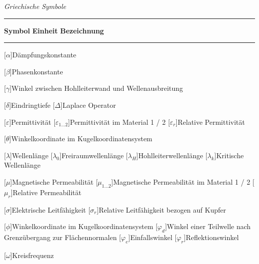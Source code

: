 \newpage



\textit{Griechische Symbole} \\[.5\linespace]
\noindent\rule{\textwidth}{0.5pt}
\textbf{Symbol} \hspace{12.5mm} \textbf{Einheit} \hspace{10.5mm} \textbf{Bezeichnung} \\[-\linespace]
\noindent\rule{\textwidth}{0.5pt}

\begin{acronym}[Platzhalterwort]
[$\alpha$]{\acrounit{-}Dämpfungskonstante}

[$\beta$]{\acrounit{-}Phasenkonstante}

[$\gamma$]{\acrounit{\radian}Winkel zwischen Hohlleiterwand und Wellenausbreitung}

[$\delta$]{\acrounit{\meter}Eindringtiefe}
[$\Delta$]{\acrounit{-}Laplace Operator}

[$\varepsilon$]{\acrounit{\ampere\second\per\volt\per\meter}Permittivität}
[$\varepsilon_{1\ldots2}$]{Permittivität im Material 1 / 2}
[$\varepsilon_r$]{Relative Permittivität}

[$\theta$]{\acrounit{\radian}Winkelkoordinate im Kugelkoordinatensystem}

[$\lambda$]{\acrounit{\meter}Wellenlänge}
[$\lambda_0$]{\acrounit{\meter}Freiraumwellenlänge}
[$\lambda_H$]{\acrounit{\meter}Hohlleiterwellenlänge}
[$\lambda_k$]{\acrounit{\meter}Kritische Wellenlänge}

[$\mu$]{\acrounit{\volt\second\per\ampere\per\meter}Magnetische Permeabilität}
[$\mu_{1\ldots2}$]{\acrounit{\volt\second\per\ampere\per\meter}Magnetische Permeabilität im Material 1 / 2}
[$\mu_r$]{Relative Permeabilität}

[$\sigma$]{\acrounit{\per\ohm\per\meter}Elektrische Leitfähigkeit}
[$\sigma_r$]{Relative Leitfähigkeit bezogen auf Kupfer}

[$\phi$]{\acrounit{\radian}Winkelkoordinate im Kugelkoordinatensystem}
[$\varphi_d$]{\acrounit{\radian}Winkel einer Teilwelle nach Grenzübergang zur Flächennormalen}
[$\varphi_e$]{\acrounit{\radian}Einfallswinkel}
[$\varphi_r$]{\acrounit{\radian}Reflektionswinkel}

[$\omega$]{\acrounit{\per\second}Kreisfrequenz}

\end{acronym}


